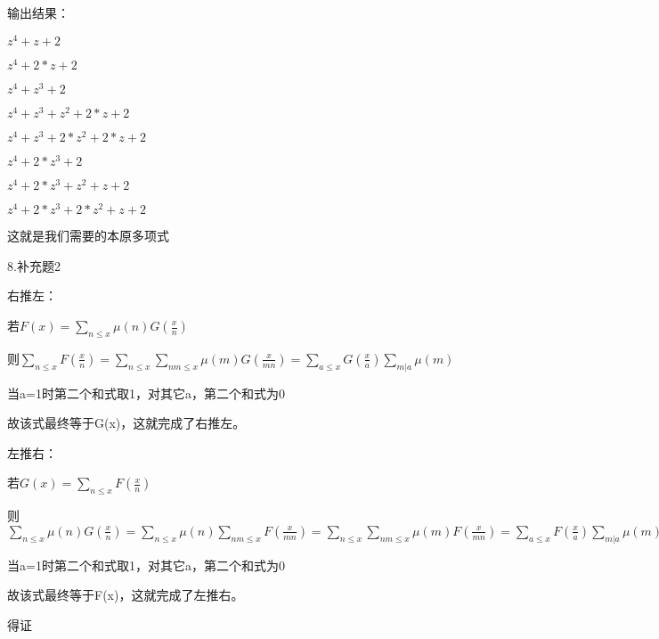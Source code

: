 \documentclass{ctexart}
\begin{document}
   输出结果：
   
   $z^4 + z + 2$
   
   $z^4 + 2*z + 2$
   
   $z^4 + z^3 + 2$
   
   $z^4 + z^3 + z^2 + 2*z + 2$
   
   $z^4 + z^3 + 2*z^2 + 2*z + 2$
   
   $z^4 + 2*z^3 + 2$
   
   $z^4 + 2*z^3 + z^2 + z + 2$
   
   $z^4 + 2*z^3 + 2*z^2 + z + 2$
   
   这就是我们需要的本原多项式
   
   8.补充题2
   
   右推左：
   
   若$F(x)=\sum_{n \leq x}\mu(n)G(\frac{x}{n})$
   
   则$\sum_{n \leq x}F(\frac{x}{n})=\sum_{n \leq x}\sum_{nm \leq x}\mu(m)G(\frac{x}{mn})=\sum_{a \leq x}G(\frac{x}{a})\sum_{m|a}\mu(m)$
   
   当a=1时第二个和式取1，对其它a，第二个和式为0
   
   故该式最终等于G(x)，这就完成了右推左。
   
   左推右：
   
   若$G(x)=\sum_{n \leq x}F(\frac{x}{n})$
   
   则$\sum_{n \leq x}\mu(n)G(\frac{x}{n})=\sum_{n \leq x}\mu(n)\sum_{nm \leq x}F(\frac{x}{mn})=\sum_{n \leq x}\sum_{nm \leq x}\mu(m)F(\frac{x}{mn})=\sum_{a \leq x}F(\frac{x}{a})\sum_{m|a}\mu(m)$
   
   当a=1时第二个和式取1，对其它a，第二个和式为0
   
   故该式最终等于F(x)，这就完成了左推右。
   
   得证
   
   	
   	
   	
   	
   	
   	
   	
   	
   	
   	
   	
   	
   	
  
\end{document}
